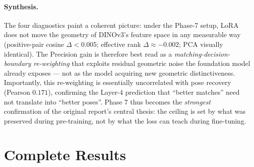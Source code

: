 \documentclass[11pt,a4paper]{article}
\begin{document}
\paragraph{Synthesis.}
The four diagnostics paint a coherent picture: under the Phase-7 setup, LoRA does not move the geometry of DINOv3's feature space in any measurable way (positive-pair cosine $\Delta < 0.005$; effective rank $\Delta \approx -0.002$; PCA visually identical). The Precision gain is therefore best read as a \emph{matching-decision-boundary re-weighting} that exploits residual geometric noise the foundation model already exposes --- not as the model acquiring new geometric distinctiveness. Importantly, this re-weighting is essentially uncorrelated with pose recovery (Pearson $0.171$), confirming the Layer-4 prediction that ``better matches'' need not translate into ``better poses''. Phase 7 thus becomes the \emph{strongest} confirmation of the original report's central thesis: the ceiling is set by what was preserved during pre-training, not by what the loss can teach during fine-tuning.

\section{Complete Results}
\end{document}
